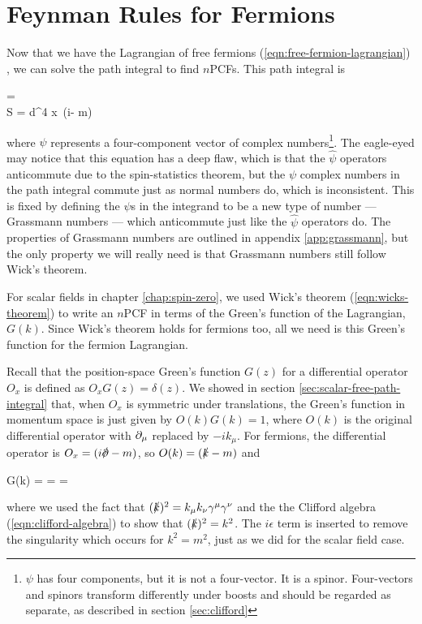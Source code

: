 \section{Feynman Rules for Fermions}
Now that we have the Lagrangian of free fermions (\ref{eqn:free-fermion-lagrangian}) , we can solve the path integral to find $n$PCFs. This path integral is
\begin{ec}
   = \\
  S = \int d^4 x\, \overline \psi (i\slashed \del - m)\psi
\end{ec}
where $\psi$ represents a four-component vector of complex numbers\footnote{$\psi$ has four components, but it is not a four-vector. It is a spinor. Four-vectors and spinors transform differently under boosts and should be regarded as separate, as described in section \ref{sec:clifford}}.
The eagle-eyed may notice that this equation has a deep flaw, which is that the $\hat \psi$ operators anticommute due to the spin-statistics theorem, but the $\psi$ complex numbers in the path integral commute just as normal numbers do, which is inconsistent. This is fixed by defining the $\psi$s in the integrand to be a new type of number --- Grassmann numbers --- which anticommute just like the $\hat \psi$ operators do. The properties of Grassmann numbers are outlined in appendix \ref{app:grassmann}, but the only property we will really need is that Grassmann numbers still follow Wick's theorem.

For scalar fields in chapter \ref{chap:spin-zero}, we used Wick's theorem (\ref{eqn:wicks-theorem}) to write an $n$PCF in terms of the Green's function of the Lagrangian, $G(k)$. Since Wick's theorem holds for fermions too, all we need is this Green's function for the fermion Lagrangian.

Recall that the position-space Green's function $G(z)$ for a differential operator $O_x$ is defined as $O_x G(z) = \delta(z)$. We showed in section \ref{sec:scalar-free-path-integral} that, when $O_x$ is symmetric under translations, the Green's function in momentum space is just given by $O(k)G(k) = 1$, where $O(k)$ is the original differential operator with $\partial_\mu$ replaced by $-ik_\mu$. For fermions, the differential operator is $O_x = (i\slashed \del - m)$, so $O(k) = (\slashed k - m)$ and
\begin{e}
  G(k) =  =  = 
  \label{eqn:fermion-propagator}
\end{e}
where we used the fact that $(\slashed k)^2 = k_\mu k_\nu \gamma^\mu \gamma^\nu$ and the the Clifford algebra (\ref{eqn:clifford-algebra}) to show that $(\slashed k)^2 = k^2$. The $i\epsilon$ term is inserted to remove the singularity which occurs for $k^2 = m^2$, just as we did for the scalar field case.

